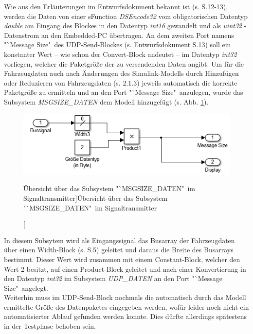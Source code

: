 \documentclass[fontsize = 12pt, paper = a4]{scrreprt}
\begin{document}
Wie aus den Erläuterungen im Entwurfsdokument bekannt ist (s. S.12-13), werden die Daten von einer sFunction \textit{DSEncode32} vom obligatorischen Datentyp \textit{double} am Eingang des Blockes in den Datentyp \textit{int16} gewandelt und als \textit{uint32} - Datenstrom an den Embedded-PC übertragen. An dem zweiten Port namens "`Message Size"\ des UDP-Send-Blockes (s. Entwurfsdokument S.13) soll ein konstanter Wert -- wie schon der Convert-Block andeutet -- im Datentyp \textit{int32} vorliegen, welcher die Paketgröße der zu versendenden Daten angibt. Um für die Fahrzeugdaten auch nach Änderungen des Simulink-Modells durch Hinzufügen oder Reduzieren von Fahrzeugdaten (s. 2.1.3) jeweils automatisch die korrekte Paketgröße zu ermitteln und an den Port "`Message Size"\ anzulegen, wurde das Subsystem \textit{MSGSIZE\_DATEN} dem Modell hinzugefügt (s. Abb. \ref{submsgsizedaten}). 

\newpage

\begin{figure}[h]
\centering
\includegraphics[scale = 0.75]{submsgsizedaten}
\caption[Übersicht über das Subsystem "`MSGSIZE\_DATEN"\ im Signaltransmitter]{Übersicht über das Subsystem "`MSGSIZE\_DATEN"\ im Signaltransmitter}
\label{submsgsizedaten}
\end{figure} 

In diesem Subsytem wird als Eingangssignal das Busarray der Fahrzeugdaten über einen Width-Block (s. S.5) geleitet und daraus die Breite des Busarrays bestimmt. Dieser Wert wird zusammen mit einem Constant-Block, welcher den Wert 2 besitzt, auf einen Product-Block geleitet und nach einer Konvertierung in den Datentyp \textit{int32} im Subsystem \textit{UDP\_DATEN} an den Port "`Message Size"\ angelegt. \\

Weiterhin muss im UDP-Send-Block nochmals die automatisch durch das Modell ermittelte Größe des Datenpaketes eingegeben werden, wofür leider noch nicht ein automatisierter Ablauf gefunden werden konnte. Dies dürfte allerdings spätestens in der Testphase behoben sein. \\
\end{document}
